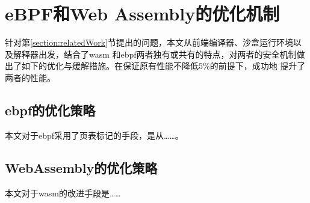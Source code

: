 \section{eBPF和Web Assembly的优化机制}
\label{section:optimizations}
    针对第\ref{section:relatedWork}节提出的问题，本文从前端编译器、沙盒运行环境以及解释器出发，结合了wasm
    和ebpf两者独有或共有的特点，对两者的安全机制做出了如下的优化与缓解措施。在保证原有性能不降低5\%的前提下，成功地
    提升了两者的性能。
\subsection{ebpf的优化策略}
    本文对于ebpf采用了页表标记的手段，是从……。
\subsection{WebAssembly的优化策略}
    本文对于wasm的改进手段是……